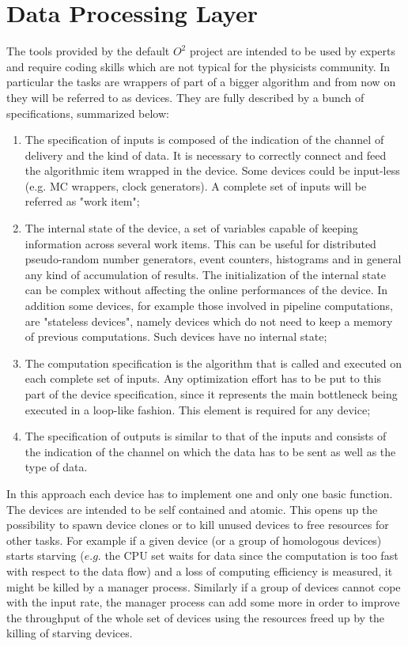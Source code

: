 \section{Data Processing Layer}
The tools provided by the default $O^2$ project are intended to be used by experts and require coding skills which are not typical for the physicists community.
In particular the tasks are wrappers of part of a bigger algorithm and from now on they will be referred to as devices.
They are fully described by a bunch of specifications, summarized below:
\begin{enumerate}
    \item The specification of inputs is composed of the indication of the channel of delivery and the kind of data. It is necessary to correctly connect and feed the algorithmic item wrapped in the device. Some devices could be input-less (e.g. MC wrappers, clock generators). A complete set of inputs will be referred as "work item";
    \item The internal state of the device, a set of variables capable of keeping information across several work items. This can be useful for distributed pseudo-random number generators, event counters, histograms and in general any kind of accumulation of results. The initialization of the internal state can be complex without affecting the online performances of the device. In addition some devices, for example those involved in pipeline computations, are "stateless devices", namely devices which do not need to keep a memory of previous computations. Such devices have no internal state;
    \item The computation specification is the algorithm that is called and executed on each complete set of inputs. Any optimization effort has to be put to this part of the device specification, since it represents the main bottleneck being executed in a loop-like fashion. This element is required for any device;
    \item The specification of outputs is similar to that of the inputs and consists of the indication of the channel on which the data has to be sent as well as the type of data.
\end{enumerate}

In this approach each device has to implement one and only one basic function.
The devices are intended to be self contained and atomic.
This opens up the possibility to spawn device clones or to kill unused devices to free resources for other tasks.
For example if a given device (or a group of homologous devices) starts starving ($e.g.$ the CPU set waits for data since the computation is too fast with respect to the data flow) and a loss of computing efficiency is measured, it might be killed by a manager process.
Similarly if a group of devices cannot cope with the input rate, the manager process can add some more in order to improve the throughput of the whole set of devices using the resources freed up by the killing of starving devices.

